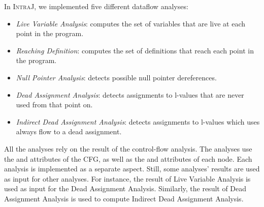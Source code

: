 In \textsc{IntraJ}, we implemented five different dataflow analyses:
\begin{itemize}
  \item \emph{Live Variable Analysis}: computes the set of variables that are live at each point in the program.
  \item \emph{Reaching Definition}: computes the set of definitions that reach each point in the program.
  \item \emph{Null Pointer Analysis}: detects possible null pointer dereferences.
  \item \emph{Dead Assignment Analysis}: detects assignments to l-values that are never used from that point on.
  \item \emph{Indirect Dead Assignment Analysis}: detects assignments to l-values which uses always flow to a dead assignment.
\end{itemize}
All the analyses rely on the result of the control-flow analysis. The analyses use
the  and  attributes of the CFG, as well as the  and 
attributes of each node.
Each analysis is implemented as a separate aspect.
Still, some analyses' results are used as input for other analyses. For instance,
the result of Live Variable Analysis is used as input for the Dead Assignment Analysis.
Similarly, the result of Dead Assignment Analysis is used to compute Indirect Dead Assignment Analysis.

